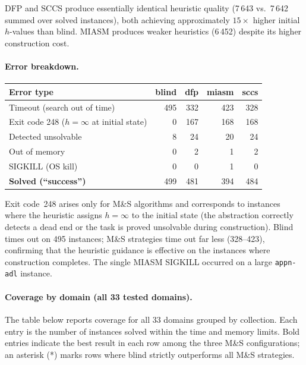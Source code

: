 \documentclass[11pt,a4paper]{article}
\begin{document}
DFP and SCCS produce essentially identical heuristic quality (7\,643
vs.\ 7\,642 summed over solved instances), both achieving approximately
$15\times$ higher initial $h$-values than blind.  MIASM produces weaker
heuristics (6\,452) despite its higher construction cost.

\paragraph{Error breakdown.}

\begin{center}
\small
\begin{tabular}{lrrrr}
\toprule
\textbf{Error type} & \textbf{blind} & \textbf{dfp} & \textbf{miasm} & \textbf{sccs} \\
\midrule
Timeout (search out of time)                  & 495 & 332 & 423 & 328 \\
Exit code 248 ($h=\infty$ at initial state)   &   0 & 167 & 168 & 168 \\
Detected unsolvable                           &   8 &  24 &  20 &  24 \\
Out of memory                                 &   0 &   2 &   1 &   2 \\
SIGKILL (OS kill)                             &   0 &   0 &   1 &   0 \\
\midrule
\textbf{Solved (``success'')}                 & 499 & 481 & 394 & 484 \\
\bottomrule
\end{tabular}
\end{center}

Exit code~248 arises only for M\&S algorithms and corresponds to instances
where the heuristic assigns $h=\infty$ to the initial state (the abstraction
correctly detects a dead end or the task is proved unsolvable during construction).
Blind times out on 495 instances; M\&S strategies time out far less (328--423),
confirming that the heuristic guidance is effective on the instances where
construction completes.
The single MIASM SIGKILL occurred on a large \texttt{appn-adl} instance.

\paragraph{Coverage by domain (all 33 tested domains).}

The table below reports coverage for all 33 domains grouped by collection.
Each entry is the number of instances solved within the time and memory limits.
Bold entries indicate the best result in each row among the three M\&S
configurations; an asterisk (*) marks rows where blind strictly outperforms
all M\&S strategies.
\end{document}

